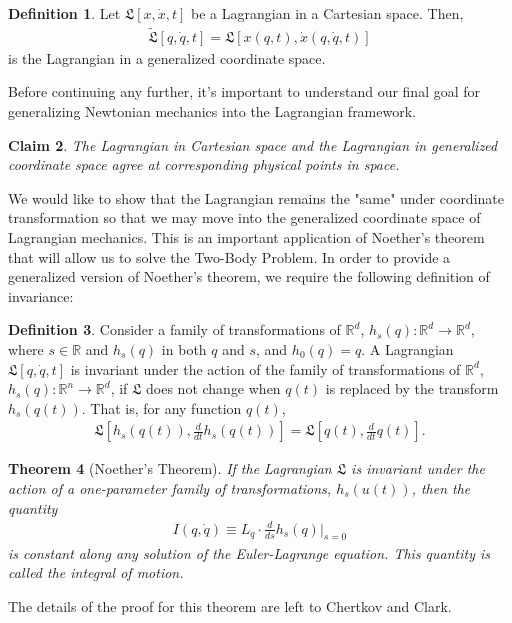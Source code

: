 \documentclass[10.5pt, psamsfonts]{amsart}
\newtheorem{thm}{Theorem}[section]
\newtheorem{claim}[thm]{Claim}
\theoremstyle{definition}
\newtheorem{defn}[thm]{Definition}
\theoremstyle{remark}
\numberwithin{equation}{section}
\begin{document}
\begin{defn}
Let $\mathfrak{L}[x, \dot{x}, t]$ be a Lagrangian in a Cartesian space. Then, 
\begin{align*}
  \tilde{\mathfrak{L}}[q, \dot{q}, t] = \mathfrak{L}[x(q,t), \dot{x}(q, \dot{q}, t)] 
\end{align*}
is the Lagrangian in a generalized coordinate space. 
\end{defn}

Before continuing any further, it's important to understand our final goal for generalizing Newtonian mechanics into the Lagrangian framework. 
\begin{claim}
  The Lagrangian in Cartesian space and the Lagrangian in generalized coordinate space agree at corresponding physical points in space.
\end{claim}
We would like to show that the Lagrangian remains the "same" under coordinate transformation so that we may move into the generalized coordinate space of Lagrangian mechanics. This is an important application of Noether's theorem that will allow us to solve the Two-Body Problem. In order to provide a generalized version of Noether's theorem, we require the following definition of invariance:

\begin{defn}
Consider a family of transformations of $\mathbb{R}^d$, $h_s(q):\mathbb{R}^d \to \mathbb{R}^d $, where $s \in \mathbb{R}$ and $h_s(q)$ in both $q$ and $s$, and $h_0(q) = q$. A Lagrangian $\mathfrak{L}[q, \dot{q}, t]$ is invariant under the action of the family of transformations of $\mathbb{R}^d$, $h_s(q): \mathbb{R}^n \to \mathbb{R}^d$, if $\mathfrak{L}$ does not change when $q(t)$ is replaced by the transform $h_s(q(t))$. That is, for any function $q(t)$,
\begin{align*}
  \mathfrak{L}[h_s(q(t)), \frac{d}{dt} h_s(q(t))] = \mathfrak{L}[q(t), \frac{d}{dt} q(t)].
\end{align*}
\end{defn}

\begin{thm}[Noether's Theorem]
If the Lagrangian $\mathfrak{L}$ is invariant under the action of a one-parameter family of transformations, $h_s(u(t))$, then the quantity
\begin{align*}
  I(q, \dot{q}) \equiv L_{\dot{q}} \cdot \frac{d}{ds} h_s(q) \bigg|_{s=0}
\end{align*}
is constant along any solution of the Euler-Lagrange equation. This quantity is called the integral of motion.
\end{thm}
\noindent The details of the proof for this theorem are left to Chertkov and Clark.\\
\end{document}
